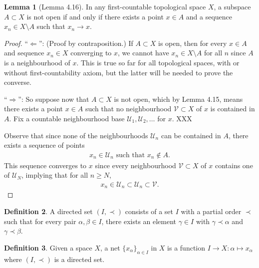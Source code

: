 \documentclass[a4paper]{book}
\theoremstyle{definition}
\newtheorem{definition}{Definition}[]
\newtheorem{lemma}[definition]{Lemma}
\begin{document}
\begin{thmbox}
    \begin{lemma}[Lemma 4.16]
        In any first-countable topological space \(X\), a subspace \(A \subset X\) is not open if and only if there exists a point \(x \in A\) and a sequence \(x_n \in X \setminus A\) such that \(x_n \rightarrow x\).
    \end{lemma}
\end{thmbox}
\begin{proof}
    ``\(\Leftarrow\)'': (Proof by contraposition.) If \(A \subset X\) is open, then for every \(x \in A\) and sequence \(x_n \in X\) converging to \(x\), we cannot have \(x_n \in X \setminus A\) for all \(n\) since \(A\) is a neighbourhood of \(x\). This is true so far for all topological spaces, with or without first-countability axiom, but the latter will be needed to prove the converse.

    ``\(\Rightarrow\)'': So suppose now that \(A \subset X\) is not open, which by Lemma 4.15, means there exists a point \(x \in A\) such that no neighbourhood \(\mathcal{V} \subset X\) of \(x\) is contained in \(A\). Fix a countable neighbourhood base \(\mathcal{U}_1, \mathcal{U}_2, \ldots\) for \(x\). XXX

    Observe that since none of the neighbourhoods \(\mathcal{U}_n\) can be contained in \(A\), there exists a sequence of points
    \begin{align*}
        x_n \in \mathcal{U}_n \text{ such that } x_n \not\in A \text{.}
    \end{align*}
    This sequence converges to \(x\) since every neighbourhood \(\mathcal{V} \subset X\) of \(x\) contains one of \(\mathcal{U}_N\), implying that for all \(n \geq N\),
    \begin{align*}
        x_n \in \mathcal{U}_n \subset \mathcal{U}_n \subset \mathcal{V} \text{.}
    \end{align*}
\end{proof}


\begin{defbox}
    \begin{definition}
        A {\color{maththen}directed set} \((I, \prec)\) consists of a set \(I\) with a partial order \(\prec\) such that for every pair \(\alpha, \beta \in I\), there exists an element \(\gamma \in I\) with \(\gamma \prec \alpha\) and \(\gamma \prec \beta\).
    \end{definition}
\end{defbox}

\begin{defbox}
    \begin{definition}
        Given a space \(X\), a net \(\{x_\alpha\}_{\alpha \in I}\) in \(X\) is a function \(I \longrightarrow X: \alpha \mapsto x_\alpha\) where \((I, \prec)\) is a directed set.
    \end{definition}
\end{defbox}
\end{document}
